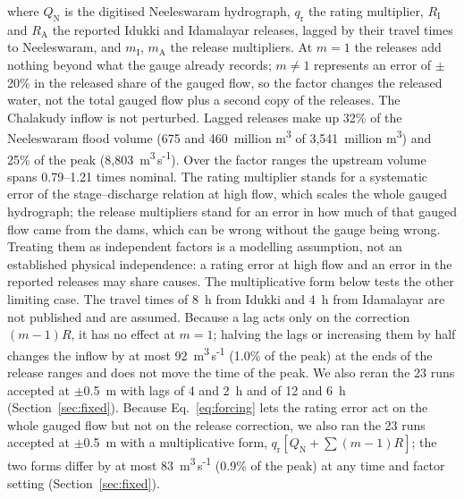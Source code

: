 \documentclass[preprint,12pt,authoryear]{elsarticle}
\newcommand{\cumecs}{m\textsuperscript{3}\,s\textsuperscript{-1}}
\newcommand{\Mcm}{million m\textsuperscript{3}}
\begin{document}
where $Q_\mathrm{N}$ is the digitised Neeleswaram hydrograph, $q_\mathrm{r}$ the rating multiplier, $R_\mathrm{I}$ and $R_\mathrm{A}$ the reported Idukki and Idamalayar releases, lagged by their travel times to Neeleswaram, and $m_\mathrm{I}$, $m_\mathrm{A}$ the release multipliers. At $m = 1$ the releases add nothing beyond what the gauge already records; $m \neq 1$ represents an error of $\pm$20\% in the released share of the gauged flow, so the factor changes the released water, not the total gauged flow plus a second copy of the releases. The Chalakudy inflow is not perturbed. Lagged releases make up 32\% of the Neeleswaram flood volume (675 and 460~\Mcm{} of 3,541~\Mcm) and 25\% of the peak (8,803~\cumecs). Over the factor ranges the upstream volume spans 0.79--1.21 times nominal. The rating multiplier stands for a systematic error of the stage--discharge relation at high flow, which scales the whole gauged hydrograph; the release multipliers stand for an error in how much of that gauged flow came from the dams, which can be wrong without the gauge being wrong. Treating them as independent factors is a modelling assumption, not an established physical independence: a rating error at high flow and an error in the reported releases may share causes. The multiplicative form below tests the other limiting case. The travel times of 8~h from Idukki and 4~h from Idamalayar are not published and are assumed. Because a lag acts only on the correction $(m-1)R$, it has no effect at $m = 1$; halving the lags or increasing them by half changes the inflow by at most 92~\cumecs{} (1.0\% of the peak) at the ends of the release ranges and does not move the time of the peak. We also reran the 23 runs accepted at $\pm$0.5~m with lags of 4 and 2~h and of 12 and 6~h (Section~\ref{sec:fixed}). Because Eq.~\ref{eq:forcing} lets the rating error act on the whole gauged flow but not on the release correction, we also ran the 23 runs accepted at $\pm$0.5~m with a multiplicative form, $q_\mathrm{r}[Q_\mathrm{N} + \sum (m-1)R]$; the two forms differ by at most 83~\cumecs{} (0.9\% of the peak) at any time and factor setting (Section~\ref{sec:fixed}).
\end{document}
